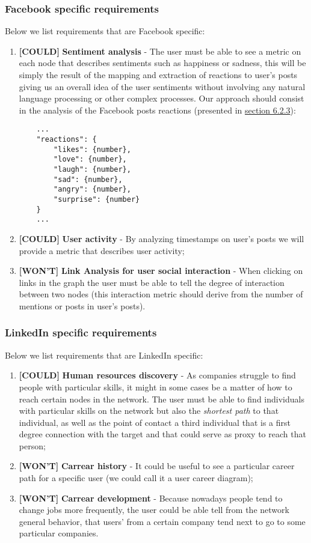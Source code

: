 \subsubsection*{Facebook specific requirements}

Below we list requirements that are Facebook specific:

\begin{enumerate}
    \item \textbf{[COULD]} \textbf{Sentiment analysis} - The user must be able to see a metric on each node that describes sentiments such as happiness or sadness, this will be simply the result of the mapping and extraction of reactions to user's posts giving us an overall idea of the user sentiments without involving any natural language processing or other complex processes. Our approach should consist in the analysis of the Facebook posts reactions (presented in \hyperref[sec:dataminer]{section 6.2.3}):
    \begin{verbatim}
    ...
    "reactions": {
        "likes": {number},
        "love": {number},
        "laugh": {number},
        "sad": {number},
        "angry": {number},
        "surprise": {number}
    }
    ...
    \end{verbatim}
    \item \textbf{[COULD]} \textbf{User activity} - By analyzing timestamps on user's posts we will provide a metric that describes user activity;
    \item \textbf{[WON'T]} \textbf{Link Analysis for user social interaction} - When clicking on links in the graph the user must be able to tell the degree of interaction between two nodes (this interaction metric should derive from the number of mentions or posts in user's posts).
\end{enumerate}

\subsubsection*{LinkedIn specific requirements}

Below we list requirements that are LinkedIn specific:

\begin{enumerate}
    \item \textbf{[COULD]} \textbf{Human resources discovery} - As companies struggle to find people with particular skills, it might in some cases be a matter of how to reach certain nodes in the network. The user must be able to find individuals with particular skills on the network but also the \textit{shortest path} to that individual, as well as the point of contact a third individual that is a first degree connection with the target and that could serve as proxy to reach that person;
    \item \textbf{[WON'T]} \textbf{Carrear history} - It could be useful to see a particular career path for a specific user (we could call it a user career diagram);
    \item \textbf{[WON'T]} \textbf{Carrear development} - Because nowadays people tend to change jobs more frequently, the user could be able tell from the network general behavior, that users' from a certain company tend next to go to some particular companies.
\end{enumerate}
